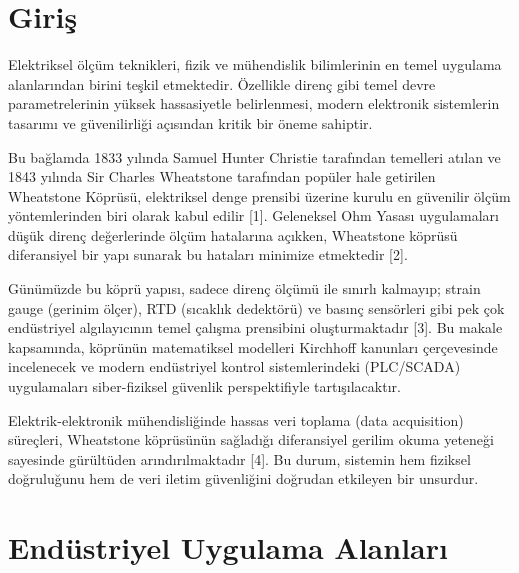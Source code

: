 \documentclass[12pt,a4paper]{article}
\begin{document}
\newpage

\section{Giriş}
Elektriksel ölçüm teknikleri, fizik ve mühendislik bilimlerinin en temel uygulama alanlarından birini teşkil etmektedir. Özellikle direnç gibi temel devre parametrelerinin yüksek hassasiyetle belirlenmesi, modern elektronik sistemlerin tasarımı ve güvenilirliği açısından kritik bir öneme sahiptir.

Bu bağlamda 1833 yılında Samuel Hunter Christie tarafından temelleri atılan ve 1843 yılında Sir Charles Wheatstone tarafından popüler hale getirilen Wheatstone Köprüsü, elektriksel denge prensibi üzerine kurulu en güvenilir ölçüm yöntemlerinden biri olarak kabul edilir [1]. Geleneksel Ohm Yasası uygulamaları düşük direnç değerlerinde ölçüm hatalarına açıkken, Wheatstone köprüsü diferansiyel bir yapı sunarak bu hataları minimize etmektedir [2].

Günümüzde bu köprü yapısı, sadece direnç ölçümü ile sınırlı kalmayıp; strain gauge (gerinim ölçer), RTD (sıcaklık dedektörü) ve basınç sensörleri gibi pek çok endüstriyel algılayıcının temel çalışma prensibini oluşturmaktadır [3]. Bu makale kapsamında, köprünün matematiksel modelleri Kirchhoff kanunları çerçevesinde incelenecek ve modern endüstriyel kontrol sistemlerindeki (PLC/SCADA) uygulamaları siber-fiziksel güvenlik perspektifiyle tartışılacaktır.

Elektrik-elektronik mühendisliğinde hassas veri toplama (data acquisition) süreçleri, Wheatstone köprüsünün sağladığı diferansiyel gerilim okuma yeteneği sayesinde gürültüden arındırılmaktadır [4]. Bu durum, sistemin hem fiziksel doğruluğunu hem de veri iletim güvenliğini doğrudan etkileyen bir unsurdur.

\newpage
\section{Endüstriyel Uygulama Alanları}
\end{document}
